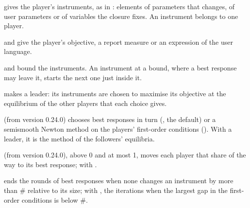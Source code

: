 \begin{optdesc}
\item[\optarg{inst}{ruments}{list}] gives the player's instruments, as in
: elements of parameters that  changes,
of user parameters or of variables the closure fixes. An instrument belongs to
one player.

\item[\optarg{max}{imize}{objective}] and  give the
player's objective, a report measure or an expression of the user language.

\item[\optarg{low}{er}{spec}] and  bound the
instruments. An instrument at a bound, where a best response may leave it,
starts the next one just inside it.

\item[\optarg{lead}{er}{player}] makes  a leader: its instruments
are chosen to maximise its objective at the equilibrium of the other players
that each choice gives.

\item[\optarg{meth}{od}{gs$|$newton}] (from version 0.24.0) chooses best
responses in turn (, the default) or a semismooth Newton method on
the players' first-order conditions (). With a leader, it is the
method of the followers' equilibria.

\item[\optarg{damp}{ing}{\#}] (from version 0.24.0), above 0 and at most 1,
moves each player that share of the way to its best response; with
.

\item[\optarg{tol}{erance}{\#}] ends the rounds of best responses when none
changes an instrument by more than \# relative to its size; with
, the iterations when the largest gap in the first-order
conditions is below \#.
\end{optdesc}


